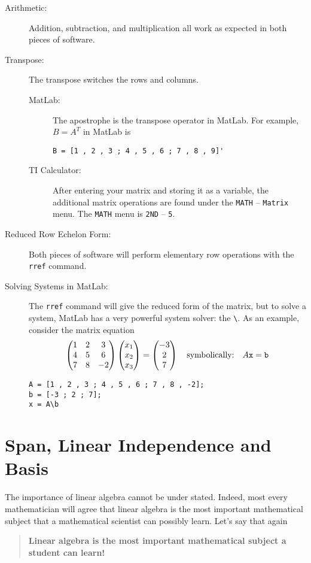 \begin{description}
    \item[Arithmetic:] Addition, subtraction, and multiplication all work as expected in
        both pieces of software.
    \item[Transpose:] The transpose switches the rows and columns.
        \begin{description}
            \item[MatLab:] The apostrophe is the transpose operator in MatLab. For
                example, $B=A^T$ in MatLab is
\begin{verbatim}
B = [1 , 2 , 3 ; 4 , 5 , 6 ; 7 , 8 , 9]'
\end{verbatim}
            \item[TI Calculator:] After entering your matrix and storing it as a variable,
                the additional matrix operations are found under the \texttt{MATH} --
                \texttt{Matrix} menu.  The \texttt{MATH} menu is \texttt{2ND} --
                \texttt{5}.
        \end{description}
    \item[Reduced Row Echelon Form:] Both pieces of software will perform elementary row
        operations with the \texttt{rref} command.
    \item[Solving Systems in MatLab:] The \texttt{rref} command will give the reduced form
        of the matrix, but to solve a system, MatLab has a very powerful system solver:
        the \verb|\|.  As an example, consider the matrix equation
        \[ \begin{pmatrix} 1 & 2 & 3 \\ 4 & 5 & 6 \\ 7 & 8 & -2 \end{pmatrix} \begin{pmatrix} x_1 \\ x_2 \\ x_3 \end{pmatrix} =
        \begin{pmatrix} -3 \\ 2 \\ 7 \end{pmatrix} \quad \text{symbolically:} \quad A \texttt{x} =
    \texttt{b} \]
\begin{verbatim}
A = [1 , 2 , 3 ; 4 , 5 , 6 ; 7 , 8 , -2];
b = [-3 ; 2 ; 7];
x = A\b
\end{verbatim}
\end{description}


\newpage
\section{Span, Linear Independence and Basis} \label{S:10.5.IndependenceDependenceBasis}
The importance of linear algebra cannot be under stated.  Indeed, most every mathematician will
agree that linear algebra is the most important mathematical subject that a mathematical
scientist can possibly learn.  Let's say that again
\begin{quote}
    {\bf Linear algebra is the most important mathematical subject a student can learn!}
\end{quote}

